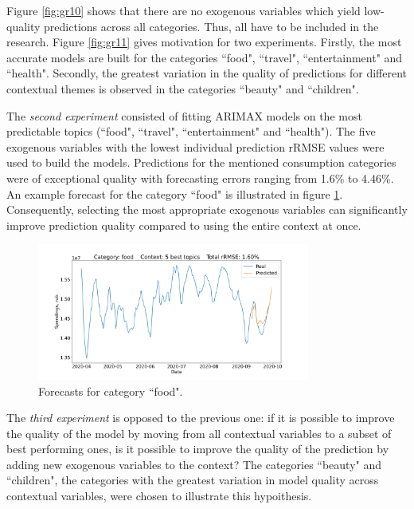 \documentclass[13pt, a4paper]{article}
\begin{document}
Figure \ref{fig:gr10} shows that there are no exogenous variables which yield low-quality predictions across all categories. Thus, all have to be included in the research. Figure \ref{fig:gr11} gives motivation for two experiments. Firstly, the most accurate models are built for the categories ``food", ``travel", ``entertainment" and ``health". Secondly, the greatest variation in the quality of predictions for different contextual themes is observed in the categories ``beauty" and ``children". 

The \textit{second experiment} consisted of fitting ARIMAX models on the most predictable topics (``food", ``travel", ``entertainment" and ``health"). The five exogenous variables with the lowest individual prediction rRMSE values were used to build the models. Predictions for the mentioned consumption categories were of exceptional quality with forecasting errors ranging from 1.6\% to 4.46\%. An example forecast for the category ``food" is illustrated in figure \ref{fig:gr12}. Consequently, selecting the most appropriate exogenous variables can significantly improve prediction quality compared to using the entire context at once.
\begin{figure}[h!]\vspace*{4pt}
\centerline{\includegraphics[width=0.8\textwidth]{./visuals/gr12.png}}
\caption{Forecasts for category ``food".}
\label{fig:gr12}
\end{figure}

The \textit{third experiment} is opposed to the previous one: if it is possible to improve the quality of the model by moving from all contextual variables to a subset of best performing ones, is it possible to improve the quality of the prediction by adding new exogenous variables to the context? The categories ``beauty" and ``children", the categories with the greatest variation in model quality across contextual variables, were chosen to illustrate this hypoithesis.
\end{document}
